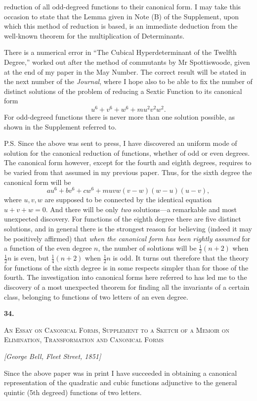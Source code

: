 \documentclass[11pt]{article}
\newcommand{\paperhead}[3]{%
  \clearpage
  \begin{center}
  {\Large\bfseries #1.}\par\vspace{0.85em}
  {\large\scshape #2}\par\vspace{0.6em}
  {\itshape [#3]}\par
  \end{center}\vspace{0.4em}}
\newcommand{\sourcepage}[1]{\marginpar{\scriptsize p.~#1}}
\begin{document}
{{\sourcepage{202}
reduction of all odd-degreed functions to their canonical form. I may take this occasion to state that the Lemma given in Note (B) of the Supplement, upon which this method of reduction is based, is an immediate deduction from the well-known theorem for the multiplication of Determinants.

There is a numerical error in ``The Cubical Hyperdeterminant of the Twelfth Degree,'' worked out after the method of commutants by Mr Spottiswoode, given at the end of my paper in the May Number. The correct result will be stated in the next number of the \emph{Journal}, where I hope also to be able to fix the number of distinct solutions of the problem of reducing a Sextic Function to its canonical form
\[
 u^6+v^6+w^6+mu^2v^2w^2.
\]
For odd-degreed functions there is never more than one solution possible, as shown in the Supplement referred to.

P.S. Since the above was sent to press, I have discovered an uniform mode of solution for the canonical reduction of functions, whether of odd or even degrees. The canonical form however, except for the fourth and eighth degrees, requires to be varied from that assumed in my previous paper. Thus, for the sixth degree the canonical form will be
\[
 au^6+bv^6+cw^6+muvw(v-w)(w-u)(u-v),
\]
where $u,v,w$ are supposed to be connected by the identical equation $u+v+w=0$. And there will be only \emph{two} solutions---a remarkable and most unexpected discovery. For functions of the eighth degree there are five distinct solutions, and in general there is the strongest reason for believing (indeed it may be positively affirmed) that \emph{when the canonical form has been rightly assumed} for a function of the even degree $n$, the number of solutions will be $\frac12(n+2)$ when $\frac12 n$ is even, but $\frac14(n+2)$ when $\frac12 n$ is odd. It turns out therefore that the theory for functions of the sixth degree is in some respects simpler than for those of the fourth. The investigation into canonical forms here referred to has led me to the discovery of a most unexpected theorem for finding all the invariants of a certain class, belonging to functions of two letters of an even degree.




\paperhead{34}{An Essay on Canonical Forms, Supplement to a Sketch of a Memoir on Elimination, Transformation and Canonical Forms}{George Bell, Fleet Street, 1851}

\sourcepage{203}
Since the above paper was in print I have succeeded in obtaining a canonical representation of the quadratic and cubic functions adjunctive to the general quintic (5th degreed) functions of two letters.

}}
\end{document}
